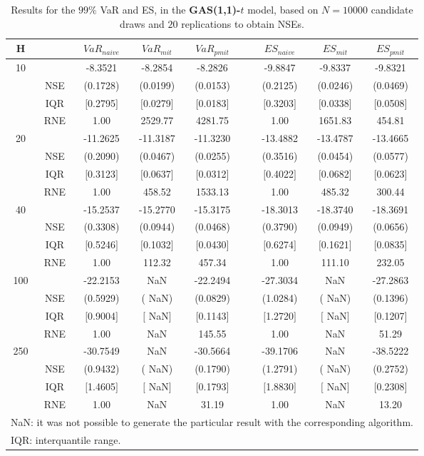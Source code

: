 \footnotesize{  
{ \renewcommand{\arraystretch}{1.3} 
\begin{longtable}{ccccccccc}  
\caption{Results for the $99\%$ VaR and ES, in the \textbf{GAS(1,1)-$t$} model, based on $N=10000$ candidate draws and $20$ replications to obtain NSEs.} 
\label{tab:res_algos_t_gas_ML} \\ 
 H & & $VaR_{naive}$ & $VaR_{mit}$ & $VaR_{pmit}$ &  & $ES_{naive}$ & $ES_{mit}$ & $ES_{pmit}$ \\ \hline 
10 & & -8.3521 & -8.2854 & -8.2826 & & -9.8847 & -9.8337 & -9.8321  \\ 
  & NSE & (0.1728) & (0.0199) & (0.0153) & & (0.2125) & (0.0246) & (0.0469)   \\ 
 & IQR & $[$0.2795$]$ & $[$0.0279$]$ & $[$0.0183$]$ & & $[$0.3203$]$ & $[$0.0338$]$ & $[$0.0508$]$  \\  
  & RNE &   1.00 & 2529.77 & 4281.75 & &   1.00 & 1651.83 & 454.81   \\ [1ex] 
20 & & -11.2625 & -11.3187 & -11.3230 & & -13.4882 & -13.4787 & -13.4665  \\ 
  & NSE & (0.2090) & (0.0467) & (0.0255) & & (0.3516) & (0.0454) & (0.0577)   \\ 
 & IQR & $[$0.3123$]$ & $[$0.0637$]$ & $[$0.0312$]$ & & $[$0.4022$]$ & $[$0.0682$]$ & $[$0.0623$]$  \\  
  & RNE &   1.00 & 458.52 & 1533.13 & &   1.00 & 485.32 & 300.44   \\ [1ex] 
40 & & -15.2537 & -15.2770 & -15.3175 & & -18.3013 & -18.3740 & -18.3691  \\ 
  & NSE & (0.3308) & (0.0944) & (0.0468) & & (0.3790) & (0.0949) & (0.0656)   \\ 
 & IQR & $[$0.5246$]$ & $[$0.1032$]$ & $[$0.0430$]$ & & $[$0.6274$]$ & $[$0.1621$]$ & $[$0.0835$]$  \\  
  & RNE &   1.00 & 112.32 & 457.34 & &   1.00 & 111.10 & 232.05   \\ [1ex] 
100 & & -22.2153 &    NaN & -22.2494 & & -27.3034 &    NaN & -27.2863  \\ 
  & NSE & (0.5929) & (   NaN) & (0.0829) & & (1.0284) & (   NaN) & (0.1396)   \\ 
 & IQR & $[$0.9004$]$ & $[$   NaN$]$ & $[$0.1143$]$ & & $[$1.2720$]$ & $[$   NaN$]$ & $[$0.1207$]$  \\  
  & RNE &   1.00 &    NaN & 145.55 & &   1.00 &    NaN &  51.29   \\ [1ex] 
250 & & -30.7549 &    NaN & -30.5664 & & -39.1706 &    NaN & -38.5222  \\ 
  & NSE & (0.9432) & (   NaN) & (0.1790) & & (1.2791) & (   NaN) & (0.2752)   \\ 
 & IQR & $[$1.4605$]$ & $[$   NaN$]$ & $[$0.1793$]$ & & $[$1.8830$]$ & $[$   NaN$]$ & $[$0.2308$]$  \\  
  & RNE &   1.00 &    NaN &  31.19 & &   1.00 &    NaN &  13.20   \\ [1ex] 
\hline 
  \multicolumn{9}{l}{\footnotesize{NaN: it was not possible to generate the particular result with the corresponding algorithm.}} \\ 
  \multicolumn{9}{l}{\footnotesize{IQR: interquantile range.}} \\ 
\end{longtable} 
} 
} 
